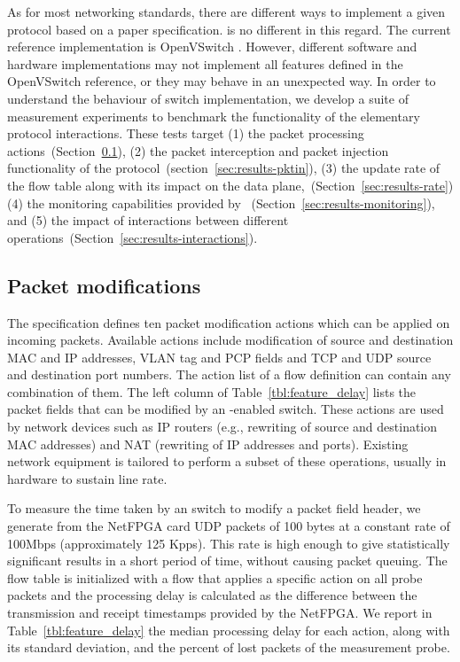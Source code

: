 As for most networking standards, there are different ways to implement a
given protocol based on a paper specification. \of is no different in this
regard. The current \of reference implementation is OpenVSwitch
\cite{openvswitch}. However, different software and hardware implementations may
not implement all features defined in the OpenVSwitch reference, or they may
behave in an unexpected way. In order to understand the behaviour of switch \of
implementation, we develop a suite of measurement experiments to
benchmark the functionality of the elementary protocol interactions.  These
tests target (1) the \of packet processing
actions~(Section~\ref{sec:results-packets}), (2)
the packet interception and packet injection functionality of the
protocol~(section~\ref{sec:results-pktin}), (3) the update rate of the \of flow table along
with its impact on the data plane,~(Section~\ref{sec:results-rate}) (4) the monitoring
capabilities provided by \of~(Section~\ref{sec:results-monitoring}), and (5) the impact of interactions between
different \of operations~(Section~\ref{sec:results-interactions}).


\subsection{Packet modifications}\label{sec:results-packets}

The \of specification \cite{openflow-spec} defines ten packet modification
actions which can be applied on incoming packets. Available actions include
modification of source and destination MAC and IP addresses, VLAN tag and PCP
fields and TCP and UDP source and destination port numbers. The action list
of a flow definition can contain any combination of them. The left column of
Table~\ref{tbl:feature_delay} lists the packet fields that can be modified by an
\of-enabled switch.  These actions are used by network devices such as IP
routers (e.g., rewriting of source and destination MAC addresses) and NAT
(rewriting of IP addresses and ports). Existing network equipment is tailored to
perform a subset of these operations, usually in hardware to sustain line rate.

To measure the time taken by an \of switch to modify a packet field header, we
generate from the NetFPGA card UDP packets of 100 bytes at a constant rate of
100Mbps (approximately 125 Kpps).  This rate is high enough to give
statistically significant results in a short period of time, without causing
packet queuing.  The flow table is initialized with a flow that applies a
specific action on all probe packets and the processing delay is calculated as
the difference between the transmission and receipt timestamps provided by the
NetFPGA.  We report in Table~\ref{tbl:feature_delay} the median processing delay
for each action, along with its standard deviation, and the percent of lost
packets of the measurement probe.

